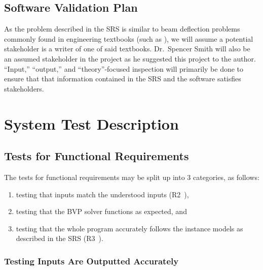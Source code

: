 \documentclass[12pt, titlepage]{article}
\begin{document}
\subsection{Software Validation Plan}

As the problem described in the SRS is similar to beam deflection problems
commonly found in engineering textbooks (such as \cite{BeerJohnston1981}), we
will assume a potential stakeholder is a writer of one of said textbooks.
Dr.~Spencer Smith will also be an assumed stakeholder in the project as he
suggested this project to the author. ``Input,'' ``output,'' and
``theory''-focused inspection will primarily be done to ensure that that
information contained in the SRS and the software satisfies stakeholders.

\newpage{}

\section{System Test Description}

\subsection{Tests for Functional Requirements}

The tests for functional requirements may be split up into 3 categories, as
follows:

\begin{enumerate}
    
    \item testing that inputs match the understood inputs
          (R2~\cite{BalaciBeamBendingSRS2023}),

    \item testing that the BVP solver functions as expected, and
    
    \item testing that the whole program accurately follows the instance models
          as described in the SRS (R3~\cite{BalaciBeamBendingSRS2023}).
    
\end{enumerate}

\subsubsection{Testing Inputs Are Outputted Accurately}
\end{document}
